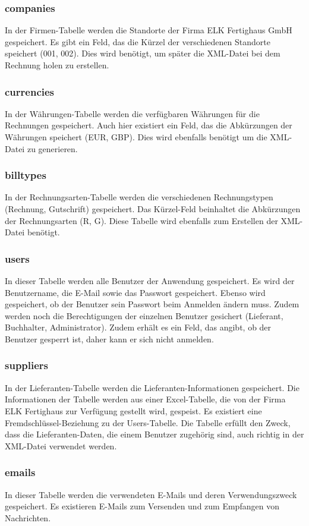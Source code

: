 \subsubsection{companies}
In der Firmen-Tabelle werden die Standorte der Firma ELK Fertighaus GmbH gespeichert. Es gibt ein Feld, das die Kürzel der verschiedenen Standorte speichert (001, 002). Dies wird benötigt, um später die XML-Datei bei dem Rechnung holen zu erstellen.
\subsubsection{currencies}
In der Währungen-Tabelle werden die verfügbaren Währungen für die Rechnungen gespeichert. Auch hier existiert ein Feld, das die Abkürzungen der Währungen speichert (EUR, GBP). Dies wird ebenfalls benötigt um die XML-Datei zu generieren.
\subsubsection{billtypes}
In der Rechnungsarten-Tabelle werden die verschiedenen Rechnungstypen (Rechnung, Gutschrift) gespeichert. Das Kürzel-Feld beinhaltet die Abkürzungen der Rechnungsarten (R, G). Diese Tabelle wird ebenfalls zum Erstellen der XML-Datei benötigt.
\subsubsection{users}
In dieser Tabelle werden alle Benutzer der Anwendung gespeichert. Es wird der Benutzername, die E-Mail sowie das Passwort gespeichert. Ebenso wird gespeichert, ob der Benutzer sein Passwort beim Anmelden ändern muss. Zudem werden noch die Berechtigungen der einzelnen Benutzer gesichert (Lieferant, Buchhalter, Administrator). Zudem erhält es ein Feld, das angibt, ob der Benutzer gesperrt ist, daher kann er sich nicht anmelden.
\subsubsection{suppliers}
In der Lieferanten-Tabelle werden die Lieferanten-Informationen gespeichert. Die Informationen der Tabelle werden aus einer Excel-Tabelle, die von der Firma ELK Fertighaus zur Verfügung gestellt wird, gespeist. Es existiert eine Fremdschlüssel-Beziehung zu der Users-Tabelle. Die Tabelle erfüllt den Zweck, dass die Lieferanten-Daten, die einem Benutzer zugehörig sind, auch richtig in der XML-Datei verwendet werden.
\subsubsection{emails}
In dieser Tabelle werden die verwendeten E-Mails und deren Verwendungszweck gespeichert. Es existieren E-Mails zum Versenden und zum Empfangen von Nachrichten.
\newpage 
